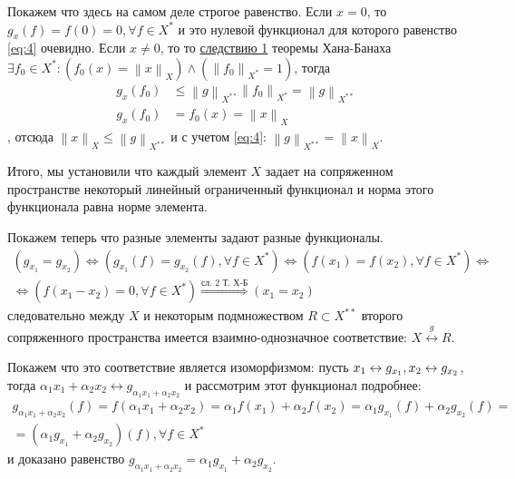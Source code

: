 \documentclass[12pt,a4paper]{article}
\theoremstyle{definition}
\newcommand{\norm}[1]{\left\lVert#1\right\rVert}
\begin{document}
Покажем что здесь на самом деле строгое равенство. Если $x = 0$, то \\ $g_{x}(f) = f(0) = 0, \forall f \in X^*$ и это нулевой функционал для которого равенство \eqref{eq:4} очевидно. Если $x \neq 0$, то то \hyperref[corll:1]{следствию 1} теоремы Хана-Банаха $\exists f_0 \in X^*: (f_0 (x) = \norm{x}_X) \wedge (\norm{f_0}_{X^*} = 1)$, тогда 
\begin{align*}
	g_{x} (f_0) &\leq \norm{g}_{X^{**}} \norm{f_0}_{X^*} = \norm{g}_{X^{**}} \\
	g_{x} (f_0) &= f_0 (x) = \norm{x}_X
\end{align*}
, отсюда $\norm{x}_X \leq \norm{g}_{X^{**}}$ и с учетом \eqref{eq:4}:  $\norm{g}_{X^{**}} = \norm{x}_X$.

Итого, мы установили что каждый элемент $X$ задает на сопряженном пространстве некоторый линейный ограниченный функционал и норма этого функционала равна норме элемента.

Покажем теперь что разные элементы задают разные функционалы. \begin{multline*}
	\left(g_{x_1} = g_{x_2}\right) \Leftrightarrow \left(g_{x_1}(f) = g_{x_2}(f), \forall f \in X^*\right)  \Leftrightarrow \left(f(x_1) = f(x_2), \forall f \in X^*\right) \Leftrightarrow \\ \Leftrightarrow \left(f(x_1 - x_2) = 0, \forall f \in X^* \right) \overset{\hyperref[corll:2]{\text{сл. 2 Т. Х-Б}}}{\Rightarrow} \left(x_1 = x_2\right)
\end{multline*}
следовательно между $X$ и некоторым подмножеством $R \subset X^{**}$ второго сопряженного пространства имеется взаимно-однозначное соответствие: $X \overset{g}{\leftrightarrow} R$. 

Покажем что это соответствие является изоморфизмом: пусть $x_1 \leftrightarrow g_{x_1}, \\ x_2 \leftrightarrow g_{x_2}$, тогда $\alpha_1 x_1 + \alpha_2 x_2 \leftrightarrow g_{\alpha_1 x_1 + \alpha_2 x_2}$ и рассмотрим этот функционал подробнее:
\begin{multline*}
	g_{\alpha_1 x_1 + \alpha_2 x_2}(f) = f(\alpha_1 x_1 + \alpha_2 x_2) = \alpha_1 f(x_1) + \alpha_2 f(x_2) = \alpha_1 g_{x_1}(f) + \alpha_2 g_{x_2}(f) = \\ = (\alpha_1 g_{x_1} + \alpha_2 g_{x_2})(f), \forall f \in X^*
\end{multline*}
и доказано равенство $g_{\alpha_1 x_1 + \alpha_2 x_2} = \alpha_1 g_{x_1} + \alpha_2 g_{x_2}$. 
\end{document}
